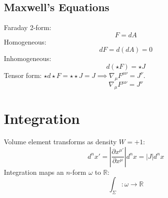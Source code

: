 \documentclass[11pt, a4paper]{report}
\begin{document}
\subsection*{Maxwell's Equations}
Faraday 2-form: \begin{equation} F = dA \end{equation}
Homogeneous: \begin{equation} dF = d(dA) = 0 \end{equation}
Inhomogeneous: \begin{equation} d(\star F) = \star J \end{equation}
Tensor form: $\star d \star F = \star \star J = J \implies \nabla_\mu F^{\mu\nu} = J^\nu$.
\begin{equation} \nabla_\mu F^{\mu\nu} = J^\nu \end{equation}

\section{Integration}
Volume element transforms as density $W=+1$:
\begin{equation} d^n x' = \left| \frac{\partial x^{\mu'}}{\partial x^\mu} \right| d^n x = |J| d^n x \end{equation}
Integration maps an $n$-form $\omega$ to $\mathbb{R}$:
\begin{equation} \int_\Sigma : \omega \to \mathbb{R} \end{equation}
\end{document}
